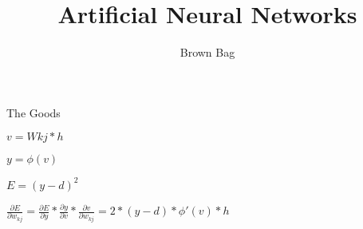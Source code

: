 \documentclass[12pt]{beamer}
\title{\sc  Artificial Neural Networks}
\subtitle{\sc Brown Bag}
\begin{document}



\begin{frame}{\sc The Goods}

$  v = Wkj*h $

$ y = \phi(v) $  

$E = (y - d)^2 $

$  \frac{\partial E}{ \partial w_{kj} } =  \frac{\partial E}{ \partial y } * \frac{\partial y}{ \partial v} * \frac{\partial v}{ \partial w_{kj} }  = 2*(y - d) * \phi'(v) * h$




\end{frame}
\end{document}
